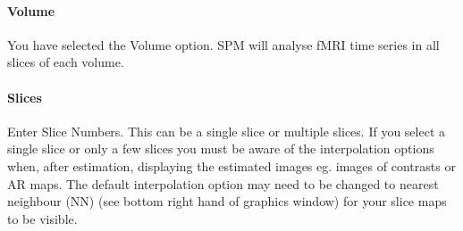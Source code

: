 \documentclass[a4paper,titlepage]{book}
\begin{document}
\paragraph{Volume}
You have selected the Volume option. SPM will analyse fMRI time series in all slices of each volume.


\paragraph{Slices}
Enter Slice Numbers. This can be a single slice or multiple slices. If you select a single slice or only a few slices you must be aware of the interpolation options when, after estimation, displaying the estimated images eg. images of contrasts or AR maps. The default interpolation option may need to be changed to nearest neighbour (NN) (see bottom right hand of graphics window) for your slice maps to be visible.
\end{document}
